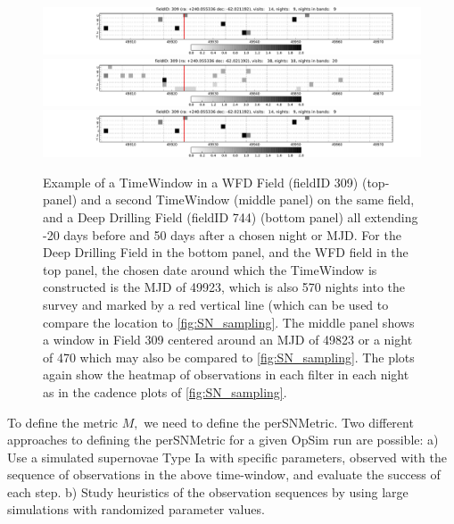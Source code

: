 \begin{figure}
\centering
 \includegraphics[width=\textwidth]{figs/supernova/TimeWindow_309_49923.pdf}
 \includegraphics[width=\textwidth]{figs/supernova/TimeWindow_309_49823.pdf}
 \includegraphics[width=\textwidth]{figs/supernova/TimeWindow_744_49923.pdf}
 \caption{Example of a TimeWindow in a WFD Field (fieldID 309)
 (top-panel) and a second TimeWindow (middle panel) on the same field,
 and a Deep Drilling Field (fieldID 744) (bottom panel) all extending
 -20 days before and 50 days after a chosen night or MJD. For the Deep
 Drilling Field in the bottom panel, and the WFD field in the top
 panel, the chosen date around which the TimeWindow is constructed is
 the MJD of 49923, which is also 570 nights into the survey and marked
 by a red vertical line (which can be used to compare the location to
 \autoref{fig:SN_sampling}. The middle panel shows a window in Field
 309 centered around an MJD of 49823 or a night of 470 which may also be
 compared to \autoref{fig:SN_sampling}. The plots again show the
 heatmap of observations in each filter in each night as in the cadence
 plots of \autoref{fig:SN_sampling}.}
  \label{fig:TimeWindow}
\end{figure}

To define the metric $M,$ we need to define the perSNMetric. Two
different approaches to defining the perSNMetric for a given OpSim run are possible: a) Use
a simulated supernovae Type Ia with specific parameters, observed with
the sequence of observations in the above time-window, and evaluate the
success of each step. b) Study heuristics of the observation sequences by using large simulations 
with randomized parameter values.

